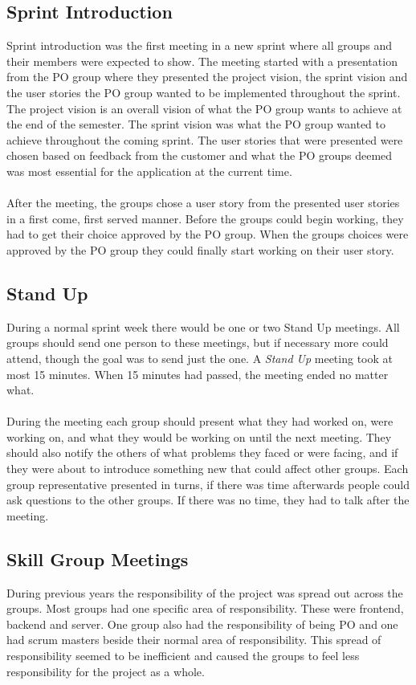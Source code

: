 \subsection{Sprint Introduction} \label{subsec:sprint-introduction}
Sprint introduction was the first meeting in a new sprint where all groups and their members were expected to show. 
The meeting started with a presentation from the PO group where they presented the project vision, the sprint vision and the user stories the PO group wanted to be implemented throughout the sprint.
The project vision is an overall vision of what the PO group wants to achieve at the end of the semester.
The sprint vision was what the PO group wanted to achieve throughout the coming sprint.
The user stories that were presented were chosen based on feedback from the customer and what the PO groups deemed was most essential for the application at the current time.
\\
\\
After the meeting, the groups chose a user story from the presented user stories in a first come, first served manner.
Before the groups could begin working, they had to get their choice approved by the PO group.
When the groups  choices were approved by the PO group they could finally start working on their user story.

\subsection{Stand Up}
During a normal sprint week there would be one or two Stand Up meetings.
All groups should send one person to these meetings, but if necessary more could attend, though the goal was to send just the one.
A \textit{Stand Up} meeting took at most 15 minutes.
When 15 minutes had passed, the meeting ended no matter what.
\\
\\
During the meeting each group should present what they had worked on, were working on, and what they would be working on until the next meeting.
They should also notify the others of what problems they faced or were facing, and if they were about to introduce something new that could affect other groups.
Each group representative presented in turns, if there was time afterwards people could ask questions to the other groups.
If there was no time, they had to talk after the meeting.


\subsection{Skill Group Meetings}
During previous years the responsibility of the project was spread out across the groups.
Most groups had one specific area of responsibility.
These were frontend, backend and server.
One group also had the responsibility of being PO and one had scrum masters beside their normal area of responsibility.
This spread of responsibility seemed to be inefficient and caused the groups to feel less responsibility for the project as a whole.
\newline
\newline

